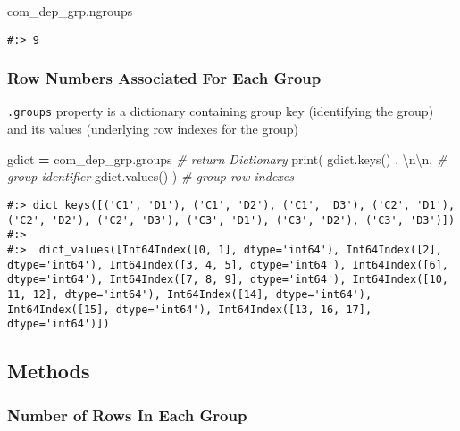 \documentclass[
]{book}
\newenvironment{Shaded}{\begin{snugshade}}{\end{snugshade}}
\newcommand{\BuiltInTok}[1]{#1}
\newcommand{\CharTok}[1]{\textcolor[rgb]{0.5,0.5,0.5}{#1}}
\newcommand{\CommentTok}[1]{\textcolor[rgb]{0.37,0.37,0.37}{\textit{#1}}}
\newcommand{\NormalTok}[1]{#1}
\newcommand{\OperatorTok}[1]{\textcolor[rgb]{0.43,0.43,0.43}{\textbf{#1}}}
\newcommand{\StringTok}[1]{\textcolor[rgb]{0.5,0.5,0.5}{#1}}
\begin{document}
\begin{Shaded}
\begin{Highlighting}[]
\NormalTok{com\_dep\_grp.ngroups}
\end{Highlighting}
\end{Shaded}

\begin{verbatim}
#:> 9
\end{verbatim}

\hypertarget{row-numbers-associated-for-each-group}{%
\subsubsection{Row Numbers Associated For Each Group}\label{row-numbers-associated-for-each-group}}

\texttt{.groups} property is a dictionary containing group key (identifying the group) and its values (underlying row indexes for the group)

\begin{Shaded}
\begin{Highlighting}[]
\NormalTok{gdict }\OperatorTok{=}\NormalTok{ com\_dep\_grp.groups       }\CommentTok{\# return Dictionary}
\BuiltInTok{print}\NormalTok{( gdict.keys()   , }\StringTok{\textquotesingle{}}\CharTok{\textbackslash{}n\textbackslash{}n}\StringTok{\textquotesingle{}}\NormalTok{,  }\CommentTok{\# group identifier}
\NormalTok{       gdict.values()   )        }\CommentTok{\# group row indexes}
\end{Highlighting}
\end{Shaded}

\begin{verbatim}
#:> dict_keys([('C1', 'D1'), ('C1', 'D2'), ('C1', 'D3'), ('C2', 'D1'), ('C2', 'D2'), ('C2', 'D3'), ('C3', 'D1'), ('C3', 'D2'), ('C3', 'D3')]) 
#:> 
#:>  dict_values([Int64Index([0, 1], dtype='int64'), Int64Index([2], dtype='int64'), Int64Index([3, 4, 5], dtype='int64'), Int64Index([6], dtype='int64'), Int64Index([7, 8, 9], dtype='int64'), Int64Index([10, 11, 12], dtype='int64'), Int64Index([14], dtype='int64'), Int64Index([15], dtype='int64'), Int64Index([13, 16, 17], dtype='int64')])
\end{verbatim}

\hypertarget{methods-1}{%
\subsection{Methods}\label{methods-1}}

\hypertarget{number-of-rows-in-each-group}{%
\subsubsection{Number of Rows In Each Group}\label{number-of-rows-in-each-group}}
\end{document}
